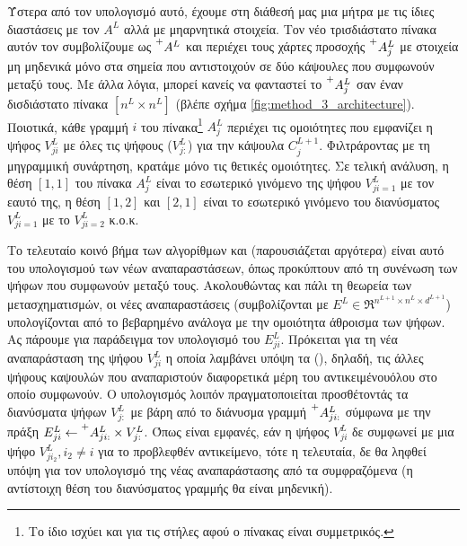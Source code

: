 Ύστερα από τον υπολογισμό αυτό, έχουμε στη διάθεσή μας μια μήτρα με τις ίδιες διαστάσεις με τον $A^L$ αλλά με μη\textendash αρνητικά στοιχεία. Τον νέο τρισδιάστατο πίνακα αυτόν τον συμβολίζουμε ως $\prescript{+}{}{A^{L}}$ και περιέχει τους χάρτες προσοχής $\prescript{+}{}{A_j^{L}}$ με στοιχεία μη μηδενικά μόνο στα σημεία που αντιστοιχούν σε δύο κάψουλες που συμφωνούν μεταξύ τους. Με άλλα λόγια, μπορεί κανείς να φανταστεί το $\prescript{+}{}{A_j^{L}}$ σαν έναν δισδιάστατο πίνακα $[n^L \times n^L]$ (βλέπε σχήμα \ref{fig:method_3_architecture}). Ποιοτικά, κάθε γραμμή $i$ του πίνακα\footnote{Το ίδιο ισχύει και για τις στήλες αφού ο πίνακας είναι συμμετρικός.} $A_j^{L}$ περιέχει τις ομοιότητες που εμφανίζει η ψήφος $V_{ji}^L$ με όλες τις ψήφους ($V_{j:}^L$) για την κάψουλα $C_j^{L+1}$. Φιλτράροντας με τη μη\textendash γραμμική συνάρτηση, κρατάμε μόνο τις θετικές ομοιότητες. Σε τελική ανάλυση, η θέση $[1,1]$ του πίνακα $A_j^{L}$ είναι το εσωτερικό γινόμενο της ψήφου $V_{ji=1}^L$ με τον εαυτό της, η θέση $[1,2]$ και $[2,1]$ είναι το εσωτερικό γινόμενο του διανύσματος $V_{ji=1}^L$ με το $V_{ji=2}^L$ κ.ο.κ.\par

Το τελευταίο κοινό βήμα των αλγορίθμων  και  (παρουσιάζεται αργότερα) είναι αυτό του υπολογισμού των νέων αναπαραστάσεων, όπως προκύπτουν από τη συνένωση των ψήφων που συμφωνούν μεταξύ τους. Ακολουθώντας και πάλι τη θεωρεία των μετασχηματισμών, οι νέες αναπαραστάσεις (συμβολίζονται με $E^L \in \Re^{n^{L+1} \times n^{L} \times d^{L+1}}$) υπολογίζονται από το βεβαρημένο ανάλογα με την ομοιότητα άθροισμα των ψήφων. Ας πάρουμε για παράδειγμα τον υπολογισμό του $E^L_{ji}$. Πρόκειται για τη νέα αναπαράσταση της ψήφου $V^L_{ji}$ η οποία λαμβάνει υπόψη τα  (), δηλαδή, τις άλλες ψήφους καψουλών που αναπαριστούν διαφορετικά μέρη του αντικειμένου\textendash όλου στο οποίο συμφωνούν. Ο υπολογισμός λοιπόν πραγματοποιείται προσθέτοντάς τα διανύσματα ψήφων $V^L_{j:}$ με βάρη από το διάνυσμα γραμμή $\prescript{+}{}{A_{ji:}^{L}}$ σύμφωνα με την πράξη $E^L_{ji} \gets \prescript{+}{}{A_{ji:}^{L}} \times V^L_{j:}$. Όπως είναι εμφανές, εάν η ψήφος $V^L_{ji}$ δε συμφωνεί με μια ψήφο $V^L_{ji_2}, i_2 \neq i$ για το προβλεφθέν αντικείμενο, τότε η τελευταία, δε θα ληφθεί υπόψη για τον υπολογισμό της νέας αναπαράστασης από τα συμφραζόμενα (η αντίστοιχη θέση του διανύσματος γραμμής θα είναι μηδενική).\par

